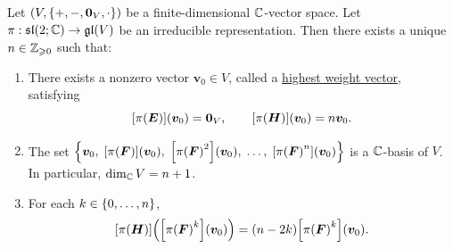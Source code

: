 \documentclass[11pt,reqno]{amsart}
\begin{document}
\begin{Thm}\label{thm:sl2-irrep-classification}
Let $\Br{V,\set{+,-,\bm0_V,\cdot}}$ be a finite-dimensional $\mathbb{C}$-vector space.
Let $\pi:\mathfrak{sl}(2;\mathbb{C})\to\mathfrak{gl}(V)$ be an irreducible representation.
Then there exists a unique $n\in\mathbb{Z}_{\geqslant 0}$ such that:
\begin{enumerate}
\item There exists a nonzero vector $\bm{v}_0\in V$, called a
\ul{highest weight vector}, satisfying
\[
\FUNC{\pi(\bm E)}{\bm{v}_0}=\bm0_V,\qquad
\FUNC{\pi(\bm H)}{\bm{v}_0}=n \bm{v}_0.
\]
\item The set
$\set{\bm{v}_0,\;\FUNC{\pi(\bm F)}{\bm{v}_0},\;\FUNC{\pi\Br{\bm F}^2}{\bm{v}_0},\;
\dots,\;\FUNC{\pi\Br{\bm F}^n}{\bm{v}_0}}$
is a $\mathbb{C}$-basis of $V$.
In particular, $\dim_{\mathbb{C}} V=n+1$.
\item For each $k\in\set{0,\dots,n}$,
\[
\FUNC{\pi(\bm H)}{\FUNC{\pi\Br{\bm F}^k}{\bm{v}_0}}=(n-2k)\FUNC{\pi\Br{\bm F}^k}{\bm{v}_0}.
\]
\end{enumerate}
\end{Thm}
\end{document}
